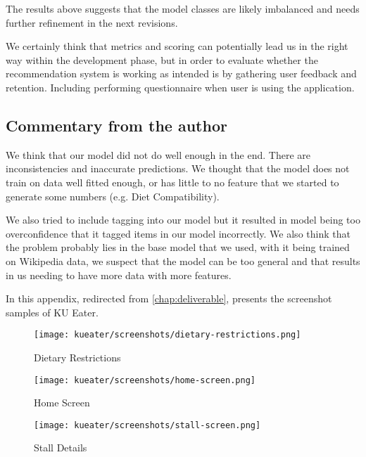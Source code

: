 The results above suggests that the model classes are likely imbalanced and needs further refinement in the next revisions.

We certainly think that metrics and scoring can potentially lead us in
the right way within the development phase, but in order to evaluate
whether the recommendation system is working as intended is by gathering
user feedback and retention. Including performing questionnaire when user
is using the application.

\subsection{Commentary from the author}
We think that our model did not do well enough in the end. There are 
inconsistencies and inaccurate predictions. We thought that the model
does not train on data well fitted enough, or has little to no feature that
we started to generate some numbers (e.g. Diet Compatibility).

We also tried to include tagging into our model but it resulted in model being
too overconfidence that it tagged items in our model incorrectly. We also think that
the problem probably lies in the base model that we used, with it being trained
on Wikipedia data, we suspect that the model can be too general and that
results in us needing to have more data with more features.

In this appendix, redirected from \ref{chap:deliverable}, presents the screenshot samples of KU Eater.

\begin{figure}[h!]
    \centering
    \texttt{[image: kueater/screenshots/dietary-restrictions.png]}
    \caption{Dietary Restrictions}
    \label{fig:dietary-restrictions-screen}
\end{figure}

\begin{figure}[h!]
    \centering
    \texttt{[image: kueater/screenshots/home-screen.png]}
    \caption{Home Screen}
    \label{fig:home-screen}
\end{figure}

\begin{figure}[h!]
    \centering
    \texttt{[image: kueater/screenshots/stall-screen.png]}
    \caption{Stall Details}
    \label{fig:stall-screen}
\end{figure}

